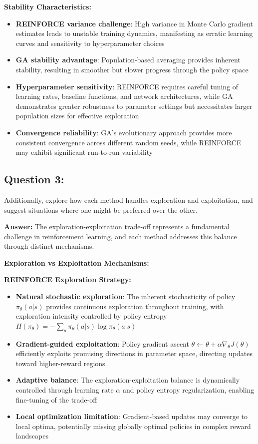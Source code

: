 \documentclass[12pt]{article}
\begin{document}
{{{\textbf{Stability Characteristics:}
\begin{itemize}
    \item \textbf{REINFORCE variance challenge}: High variance in Monte Carlo gradient estimates leads to unstable training dynamics, manifesting as erratic learning curves and sensitivity to hyperparameter choices
    \item \textbf{GA stability advantage}: Population-based averaging provides inherent stability, resulting in smoother but slower progress through the policy space
    \item \textbf{Hyperparameter sensitivity}: REINFORCE requires careful tuning of learning rates, baseline functions, and network architectures, while GA demonstrates greater robustness to parameter settings but necessitates larger population sizes for effective exploration
    \item \textbf{Convergence reliability}: GA's evolutionary approach provides more consistent convergence across different random seeds, while REINFORCE may exhibit significant run-to-run variability
\end{itemize}

\subsection{Question 3:}
Additionally, explore how each method handles exploration and exploitation, and suggest situations where one might be preferred over the other. 

\textbf{Answer:} The exploration-exploitation trade-off represents a fundamental challenge in reinforcement learning, and each method addresses this balance through distinct mechanisms.

\textbf{Exploration vs Exploitation Mechanisms:}

\textbf{REINFORCE Exploration Strategy:}
\begin{itemize}
    \item \textbf{Natural stochastic exploration}: The inherent stochasticity of policy $\pi_\theta(a|s)$ provides continuous exploration throughout training, with exploration intensity controlled by policy entropy $H(\pi_\theta) = -\sum_a \pi_\theta(a|s) \log \pi_\theta(a|s)$
    \item \textbf{Gradient-guided exploitation}: Policy gradient ascent $\theta \leftarrow \theta + \alpha \nabla_\theta J(\theta)$ efficiently exploits promising directions in parameter space, directing updates toward higher-reward regions
    \item \textbf{Adaptive balance}: The exploration-exploitation balance is dynamically controlled through learning rate $\alpha$ and policy entropy regularization, enabling fine-tuning of the trade-off
    \item \textbf{Local optimization limitation}: Gradient-based updates may converge to local optima, potentially missing globally optimal policies in complex reward landscapes
\end{itemize}

}}}
\end{document}
